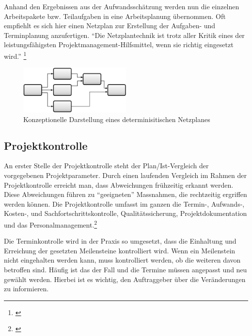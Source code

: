 Anhand den Ergebnissen aus der Aufwandsschätzung werden nun die einzelnen
Arbeitspakete bzw. Teilaufgaben in eine Arbeitsplanung übernommen. Oft empfiehlt
es sich hier einen Netzplan zur Erstellung der Aufgaben- und Terminplanung
anzufertigen. ``Die Netzplantechnik ist trotz aller Kritik eines der 
leistungsfähigsten Projektmanagement-Hilfsmittel, wenn sie richtig eingesetzt wird.''
\footnote{\citealp*[S. 14]{burghardt2007einfuehrung}}

\begin{figure}[htbp]
\begin{center}
\includegraphics[width=0.5\textwidth,angle=0]{./bilder/theorie/03_darstellung_netzplan.pdf}
\caption[Konzeptionelle Darstellung eines determinisitischen Netzplanes]{Konzeptionelle 
    Darstellung eines determinisitischen Netzplanes\footnotemark}
\label{pic:03_darstellung_netzplan}
\end{center}
\end{figure}


\subsection{Projektkontrolle}
An erster Stelle der Projektkontrolle steht der Plan/Ist-Vergleich der vorgegebenen
Projektparameter. Durch einen laufenden Vergleich im Rahmen der Projektkontrolle
erreicht man, dass Abweichungen frühzeitig erkannt werden. Diese Abweichungen
führen zu ``geeigneten'' Massnahmen, die rechtzeitig ergriffen werden können.
Die Projektkontrolle umfasst im ganzen die Termin-, Aufwands-, Kosten-, 
und Sachfortschrittskontrolle, Qualitätssicherung, Projektdokumentation und
das Personalmanagement.\footnote{\citealp*[Vgl.][S. 15]{burghardt2007einfuehrung}}

Die Terminkontrolle wird in der Praxis so umgesetzt, dass die Einhaltung
und Erreichung der gesetzten Meilensteine kontrolliert wird. Wenn ein 
Meilenstein nicht eingehalten werden kann, muss kontrolliert werden, ob die
weiteren davon betroffen sind. Häufig ist das der Fall und die Termine
müssen angepasst und neu gewählt werden. Hierbei ist es wichtig, den Auftraggeber
über die Veränderungen zu informieren.

